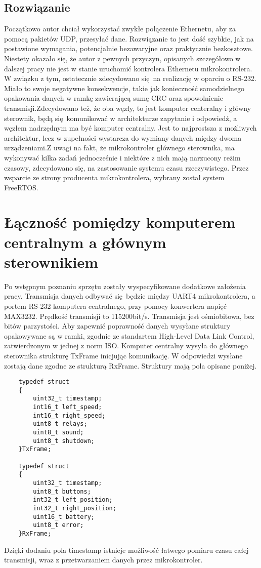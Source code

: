 \documentclass[10pt,a4paper]{article}
\begin{document}
	\subsection{Rozwiązanie}
	Początkowo autor chciał wykorzystać zwykłe połączenie Ethernetu, aby za pomocą pakietów UDP, przesyłać dane. Rozwiązanie to jest dość szybkie, jak na postawione wymagania, potencjalnie bezawaryjne oraz praktycznie bezkosztowe. Niestety okazało się, że autor z pewnych przyczyn, opisanych szczegółowo w dalszej pracy nie jest w stanie uruchomić kontrolera Ethernetu mikrokontrolera. W związku z tym, ostatecznie zdecydowano się na realizację w oparciu o RS-232. Miało to swoje negatywne konsekwencje, takie jak konieczność samodzielnego opakowania danych w ramkę zawierającą sumę CRC oraz spowolnienie transmisji.\newline Zdecydowano też, że oba węzły, to jest komputer centeralny i główny sterownik, będą się komunikować w architekturze zapytanie i odpowiedź, a węzłem nadrzędnym ma być komputer centralny. Jest to najprostsza z możliwych architektur, lecz w zupełności wystarcza do wymiany danych między dwoma urządzeniami.\newline Z uwagi na fakt, że mikrokontroler głównego sterownika, ma wykonywać kilka zadań jednocześnie i niektóre z nich mają narzucony reżim czasowy, zdecydowano się, na zastosowanie systemu czasu rzeczywistego. Przez wsparcie ze strony producenta mikrokontrolera, wybrany został system FreeRTOS.

	\section{Łączność pomiędzy komputerem centralnym a głównym sterownikiem}
	Po wstępnym poznaniu sprzętu zostały wyspecyfikowane dodatkowe założenia pracy. Transmisja danych odbywać się będzie między UART4 mikrokontrolera, a portem RS-232 komputera centralnego, przy pomocy konwertera napięć MAX3232. Prędkość transmisji to 115200bit/s. Transmisja jest ośmiobitowa, bez bitów parzystości. Aby zapewnić poprawność danych wysyłane struktury opakowywane są w ramki, zgodnie ze standartem High-Level Data Link Control, zatwierdzonym w jednej z norm ISO. Komputer centralny wysyła do głównego sterownika strukturę TxFrame inicjując komunikację. W odpowiedzi wysłane zostają dane zgodne ze strukturą RxFrame. Struktury mają pola opisane poniżej.
	\begin{lstlisting}
	typedef struct 
	{
		uint32_t timestamp;
		int16_t left_speed;
		int16_t right_speed;
		uint8_t relays;
		uint8_t sound;
		uint8_t shutdown;
	}TxFrame;

	typedef struct
	{
		uint32_t timestamp;
		uint8_t buttons;
		int32_t left_position;
		int32_t right_position;
		uint16_t battery;
		uint8_t error;
	}RxFrame;
	\end{lstlisting}
	Dzięki dodaniu pola timestamp istnieje możliwość łatwego pomiaru czasu całej transmisji, wraz z przetwarzaniem danych przez mikrokontroler.
\end{document}
